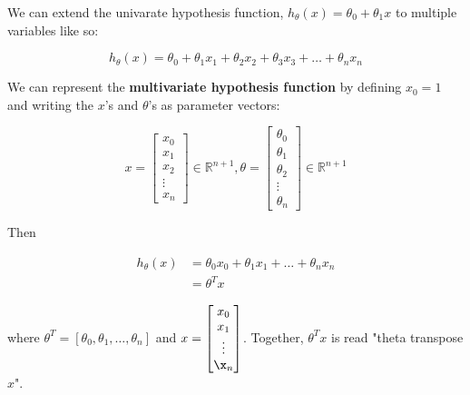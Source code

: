 \documentclass{article}
\begin{document}
        \noindent We can extend the univarate hypothesis function, $h_\theta(x)=\theta_0+\theta_1 x $ to
        multiple variables like so:

        \begin{equation*}
            h_{\theta}(x) = \theta_0 + \theta_1 x_1 + \theta_2 x_2 + \theta_3 x_3+\dots+\theta_n x_n
        \end{equation*}

        \noindent We can represent the \textbf{multivariate hypothesis function} by defining $x_0=1$ and
        writing the $x$'s and $\theta$'s as parameter vectors:

        \begin{equation*}
            x = \begin{bmatrix}
                    x_0 \\
                    x_1 \\
                    x_2 \\
                    \vdots \\
                    x_n
                \end{bmatrix}
            \in\mathbb{R}^{n+1}
            ,\theta = \begin{bmatrix}
                          \theta_0 \\
                          \theta_1 \\
                          \theta_2 \\
                          \vdots \\
                          \theta_n
                      \end{bmatrix}
            \in\mathbb{R}^{n+1}
        \end{equation*}

        \noindent Then

        \begin{align*}
            h_{\theta}(x)   &= \theta_0 x_0 + \theta_1 x_1 + \dots + \theta_n x_n \\
                            &= \theta^T x
        \end{align*}

        \noindent where $\theta^T=[\theta_0,\theta_1,\dots,\theta_n]$ and
        $x=\begin{bmatrix}x_0\\x_1\\\vdots\\\x_n\end{bmatrix}$. Together, $\theta^T x$ is read
        "theta transpose $x$". \\
\end{document}
